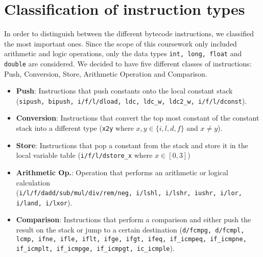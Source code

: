 \section{Classification of instruction types}
\label{sec:classification}

In order to distinguish between the different bytecode instructions, we classified the most important ones. Since the scope of this coursework only included arithmetic and logic operations, only the data types \texttt{int, long, float} and \texttt{double} are considered. We decided to have five different classes of instructions: Push, Conversion, Store, Arithmetic Operation and Comparison.



\begin{itemize}
\item \textbf{Push}: Instructions that push constants onto the local constant stack\\
			(\texttt{sipush, bipush, i/f/l/dload, ldc, ldc\_w, ldc2\_w, i/f/l/dconst}).
\item \textbf{Conversion}: Instructions that convert the top most constant of the constant stack into a different type (\texttt{x2y} where $x,y \in \{i,l,d,f\}$ and $x \neq y$).
\item \textbf{Store}: Instructions that pop a constant from the stack and store it in the local variable table (\texttt{i/f/l/dstore\_x} where $x \in [0,3]$)
\item \textbf{Arithmetic Op.}: Operation that performs an arithmetic or logical calculation\\
			(\texttt{i/l/f/dadd/sub/mul/div/rem/neg, i/lshl, i/lshr, iushr, i/lor, i/land, i/lxor}).
\item \textbf{Comparison}: Instructions that perform a comparison and either push the result on the stack or jump to a certain destination (\texttt{d/fcmpg, d/fcmpl, lcmp, ifne, ifle, iflt, ifge, ifgt, ifeq, if\_icmpeq, if\_icmpne, if\_icmplt, if\_icmpge, if\_icmpgt, ic\_icmple}).
\end{itemize}